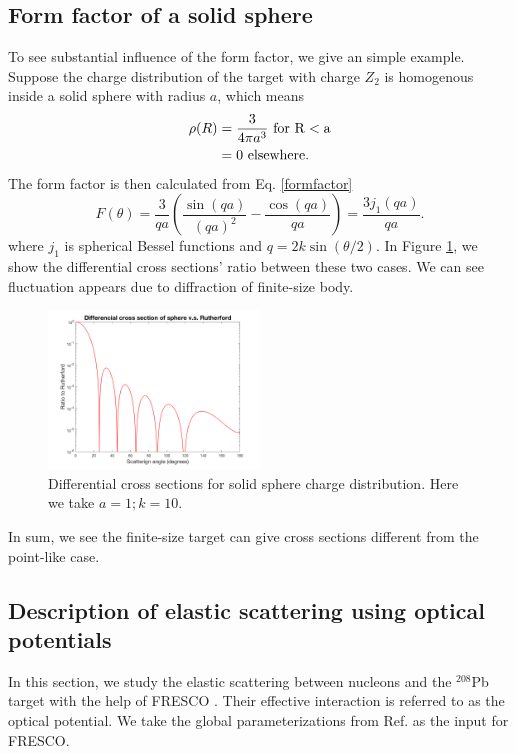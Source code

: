 \subsection{Form factor of a solid sphere}
	To see substantial influence of the form factor, we give an simple example. 
	Suppose the charge distribution of the target with charge $Z_2$ is homogenous inside a solid sphere with radius $a$, which means
	\begin{align}
		\rho(R) &= \frac{3}{4\pi a^3}\ \rm{for}\ R<a\\
		&= 0\ \rm{elsewhere}.
	\end{align}
	The form factor is then calculated from Eq. \ref{formfactor}
	\begin{equation}\label{sphereformfactor}
		F(\theta)= \frac{3}{qa}\left(\frac{\sin(qa)}{(qa)^2}-\frac{\cos(qa)}{qa}\right) = \frac{3j_1(qa)}{qa}.
	\end{equation}
	where $j_1$ is spherical Bessel functions and $q=2k\sin(\theta/2)$. In Figure \ref{fig:formfactor}, we show the differential cross sections' ratio between these two cases. We can see fluctuation appears due to diffraction of finite-size body.

	 \begin{figure}[t]
		\centering
		\includegraphics[width=0.5\textwidth]{1_1.png}
		\caption{Differential cross sections for solid sphere charge distribution. Here we take $a=1;k=10$.  }
		\label{fig:formfactor}
	\end{figure}
	
  	In sum, we see the finite-size target can give cross sections different from the point-like case.
\subsection{Description of elastic scattering using optical potentials}
	In this section, we study the elastic scattering between nucleons and the $^{208}$Pb target with the help of FRESCO\cite{FRESCO} . Their effective interaction is referred to as the optical potential. We take the global parameterizations from Ref. \cite{capote2009ripl,koning2003local} as the input for FRESCO.
	
